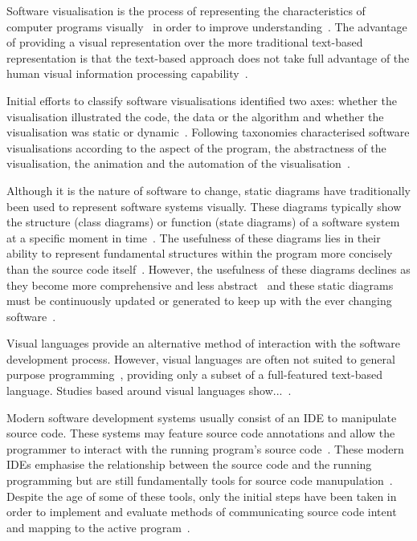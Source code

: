 Software visualisation is the process of representing the characteristics of computer programs visually~\cite{Stasko1992} in order to improve understanding~\cite{Diehl2007}. The advantage of providing a visual representation over the more traditional text-based representation is that the text-based approach does not take full advantage of the human visual information processing capability~\cite{Myers1989}.

Initial efforts to classify software visualisations identified two axes: whether the visualisation illustrated the code, the data or the algorithm and whether the visualisation was static or dynamic~\cite{Myers1989}. Following taxonomies characterised software visualisations according to the aspect of the program, the abstractness of the visualisation, the animation and the automation of the visualisation~\cite{Stasko1992}.

Although it is the nature of software to change, static diagrams have traditionally been used to represent software systems visually. These diagrams typically show the structure (class diagrams) or function (state diagrams) of a software system at a specific moment in time~\cite{Rumbaugh2004}. The usefulness of these diagrams lies in their ability to represent fundamental structures within the program more concisely than the source code itself~. However, the usefulness of these diagrams declines as they become more comprehensive and less abstract~ and these static diagrams must be continuously updated or generated to keep up with the ever changing software~.

Visual languages provide an alternative method of interaction with the software development process. However, visual languages are often not suited to general purpose programming~\cite{Myers1989}, providing only a subset of a full-featured text-based language. Studies based around visual languages show...~.

Modern software development systems usually consist of an \ac{IDE} to manipulate source code. These systems may feature source code annotations and allow the programmer to interact with the running program's source code~. These modern \acp{IDE} emphasise the relationship between the source code and the running programming but are still fundamentally tools for source code manupulation~. Despite the age of some of these tools, only the initial steps have been taken in order to implement and evaluate methods of communicating source code intent and mapping to the active program~.


